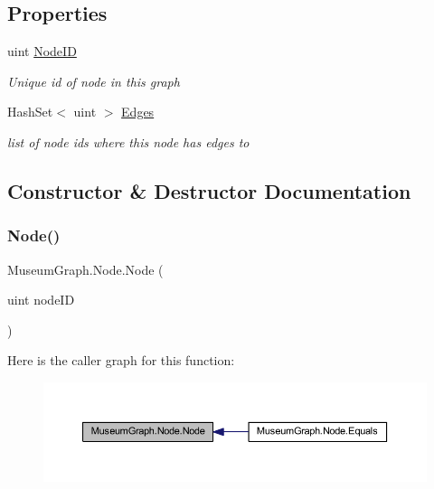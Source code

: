 \subsection*{Properties}
\begin{DoxyCompactItemize}
\item 
uint \mbox{\hyperlink{class_museum_graph_1_1_node_a6d459bfb4115130070c796f1179c27b2}{Node\+ID}}
\begin{DoxyCompactList}\small\item\em Unique id of node in this graph \end{DoxyCompactList}\item 
Hash\+Set$<$ uint $>$ \mbox{\hyperlink{class_museum_graph_1_1_node_a1442b10b52f4d1819db3b035d9aa0dd5}{Edges}}
\begin{DoxyCompactList}\small\item\em list of node ids where this node has edges to \end{DoxyCompactList}\end{DoxyCompactItemize}


\subsection{Constructor \& Destructor Documentation}
\mbox{\label{class_museum_graph_1_1_node_a917a203c77b5aa5e65c7293ba896d2c1}} 
\subsubsection{\texorpdfstring{Node()}{Node()}}
{\footnotesize\ttfamily Museum\+Graph.\+Node.\+Node (\begin{DoxyParamCaption}\item[{uint}]{node\+ID }\end{DoxyParamCaption})}

Here is the caller graph for this function\+:
\nopagebreak
\begin{figure}[H]
\begin{center}
\leavevmode
\includegraphics[width=350pt]{class_museum_graph_1_1_node_a917a203c77b5aa5e65c7293ba896d2c1_icgraph}
\end{center}
\end{figure}


